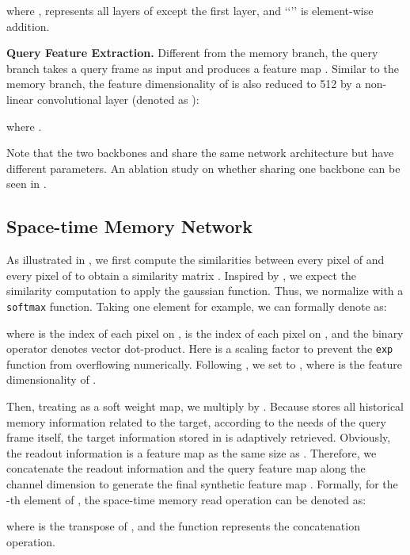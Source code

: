 \documentclass[final]{cvpr}
\begin{document}
where ,  represents all layers of  except the first layer, and \lq\lq{}\rq\rq{} is element-wise addition.
\par
\textbf{Query Feature Extraction.}
Different from the memory branch, the query branch takes a query frame  as input and produces a feature map .
Similar to the memory branch, the feature dimensionality of  is also reduced to 512 by a non-linear convolutional layer (denoted as ):

where .
\par
Note that the two backbones  and  share the same network architecture but have different parameters.
An ablation study on whether sharing one backbone can be seen in .
\par

\subsection{Space-time Memory Network}\label{subsec:space-time-memory-reader}
As illustrated in , we first compute the similarities between every pixel of  and every pixel of  to obtain a similarity matrix .
Inspired by \cite{wang2018non}, we expect the similarity computation to apply the gaussian function.
Thus, we normalize  with a \verb!softmax! function.
Taking one element  for example, we can formally denote  as:

where  is the index of each pixel on ,  is the index of each pixel on , and the binary operator  denotes vector dot-product.
Here  is a scaling factor to prevent the \verb!exp! function from overflowing numerically.
Following \cite{Vaswani2017AttentionIA}, we set  to , where  is the feature dimensionality of .

Then, treating  as a soft weight map, we multiply  by .
Because  stores all historical memory information related to the target, according to the needs of the query frame itself, the target information stored in  is adaptively retrieved.
Obviously, the readout information is a feature map as the same size as .
Therefore, we concatenate the readout information and the query feature map  along the channel dimension to generate the final synthetic feature map .
Formally, for the -th element of , the space-time memory read operation can be denoted as:

where  is the transpose of , and the  function represents the concatenation operation.
\end{document}
